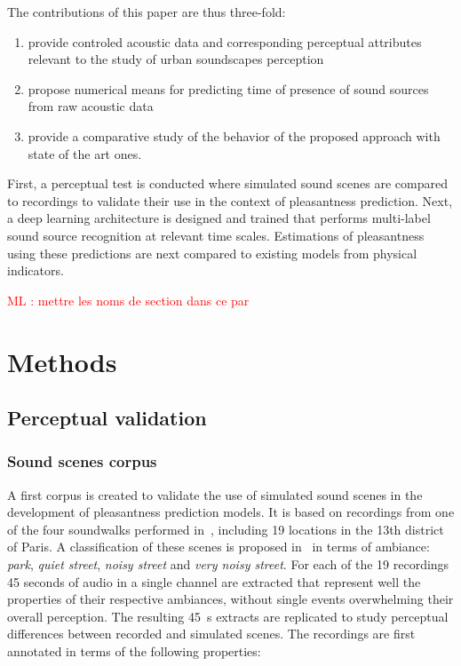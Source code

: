 \documentclass[11pt,a4paper]{article}
\newcommand{\ml}[1]{\textcolor{red}{ML : #1}}
\begin{document}
The contributions of this paper are thus three-fold:
\begin{enumerate}
  \item provide controled acoustic data and corresponding perceptual attributes relevant to the study of urban soundscapes perception
  \item propose numerical means for predicting time of presence of sound sources from raw acoustic data
  \item provide a comparative study of the behavior of the proposed approach with state of the art ones.
\end{enumerate}

First, a perceptual test is conducted where simulated sound scenes are compared to recordings to validate their use in the context of pleasantness prediction. Next, a deep learning architecture is designed and trained that performs multi-label sound source recognition at relevant time scales. Estimations of pleasantness using these predictions are next compared to existing models from physical indicators.

\ml{mettre les noms de section dans ce par}

\section{Methods}
\label{sec:methods}


\subsection{Perceptual validation}
\label{sec:pval}


\subsubsection{Sound scenes corpus}
\label{sec:pval_corp}

A first corpus is created to validate the use of simulated sound scenes in the development of pleasantness prediction models. It is based on recordings from one of the four soundwalks performed in~\cite{aumond2017}, including 19 locations in the 13th district of Paris. A classification of these scenes is proposed in~\cite{gloaguen2017} in terms of ambiance: \textit{park}, \textit{quiet street}, \textit{noisy street} and \textit{very noisy street}. For each of the 19 recordings 45 seconds of audio in a single channel are extracted that represent well the properties of their respective ambiances, without single events overwhelming their overall perception. The resulting 45~s extracts are replicated to study perceptual differences between recorded and simulated scenes. The recordings are first annotated in terms of the following properties:
\end{document}
